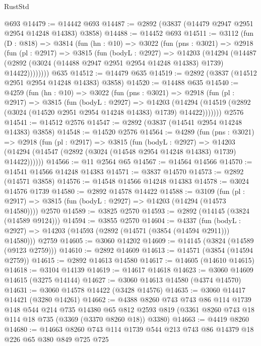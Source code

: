 \begin{lexlean}{RustStd}
\begin{coremodule}
    @693
@14479 := @14442 @693
@14487 := @2892 (@3837 (@14479 @2947 @2951 @2954 @14248 @14383) @3858)
@14488 := @14452 @693
@14511 := @3112
    (fun (D : @818) =>
    @3814
      (fun (hn : @10) =>
      @3022
        (fun (pns : @3021) =>
        @2918
          (fun (pl : @2917) =>
          @3815
            (fun (bodyL : @2927) =>
            @14203
              (@14294
                (@14487 (@2892 (@3024 (@14488 @2947 @2951 @2954 @14248 @14383) @1739) @14422))))))))
    @635
@14512 := @14479 @635
@14519 := @2892 (@3837 (@14512 @2951 @2954 @14248 @14383) @3858)
@14520 := @14488 @635
@14540 := @4259
    (fun (hn : @10) =>
    @3022
      (fun (pns : @3021) =>
      @2918
        (fun (pl : @2917) =>
        @3815
          (fun (bodyL : @2927) =>
          @14203
            (@14294 (@14519 (@2892 (@3024 (@14520 @2951 @2954 @14248 @14383) @1739) @14422)))))))
    @2576
@14541 := @14512 @2576
@14547 := @2892 (@3837 (@14541 @2954 @14248 @14383) @3858)
@14548 := @14520 @2576
@14564 := @4289
    (fun (pns : @3021) =>
    @2918
      (fun (pl : @2917) =>
      @3815
        (fun (bodyL : @2927) =>
        @14203 (@14294 (@14547 (@2892 (@3024 (@14548 @2954 @14248 @14383) @1739) @14422))))))
@14566 := @11 @2564 @65
@14567 := @14564 @14566
@14570 := @14541 @14566 @14248 @14383
@14571 := @3837 @14570
@14573 := @2892 (@14571 @3858)
@14576 := @14548 @14566 @14248 @14383
@14578 := @3024 @14576 @1739
@14580 := @2892 @14578 @14422
@14588 := @3109
    (fun (pl : @2917) => @3815 (fun (bodyL : @2927) => @14203 (@14294 (@14573 @14580))))
    @2570
@14589 := @3825 @2570
@14593 := @2892 (@14145 (@3824 (@14589 @9124)))
@14594 := @3855 @2570
@14604 := @4337
    (fun (bodyL : @2927) => @14203 (@14593 (@2892 (@14571 (@3854 (@14594 @2911))) @14580)))
    @2759
@14605 := @3060 @14202
@14609 := @14145 (@3824 (@14589 (@9123 @2759)))
@14610 := @2892 @14609
@14613 := @14571 (@3854 (@14594 @2759))
@14615 := @2892 @14613 @14580
@14617 := @14605 (@14610 @14615)
@14618 := @3104 @14139
@14619 := @14617 @14618
@14623 := @3060 @14609 @14615 (@3275 @14144)
@14627 := @3060 @14613 @14580 (@4374 @14570)
@14631 := @3060 @14578 @14422 (@3428 @14576)
@14635 := @3060 @14417 @14421 (@3280 @14261)
@14662 := @4388
    @8260
    @743
    @743
    @86
    @114
    @1739
    @148
    @544
    @214
    @735
    @14380
    @65
    @812
    @2593
    @819
    (@3361 @8260 @743 @18 @114 @18 @735 (@3369 (@3370 @8260 @18)) @3380)
@14663 := @4419 @8260
@14680 := @14663
    @8260
    @743
    @114
    @1739
    @544
    @213
    @743
    @86
    @14379
    @18
    @226
    @65
    @380
    @849
    @725
    @725

\end{coremodule}
\end{lexlean}
